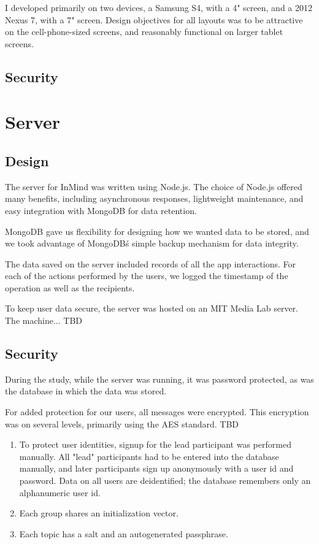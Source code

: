     I developed primarily on two devices, a Samsung S4, with a 4" screen,
    and a 2012 Nexus 7, with a 7" screen.
    Design objectives for all layouts was to be attractive on the cell-phone-sized screens,
    and reasonably functional on larger tablet screens.

    \subsection{Security}


  \section{Server}
    \subsection{Design}
      The server for InMind was written using Node.js.
      The choice of Node.js offered many benefits, including asynchronous responses,
      lightweight maintenance, and easy integration with MongoDB for data retention.

      MongoDB gave us flexibility for designing how we wanted data to be stored,
      and we took advantage of MongoDB\'s simple backup mechanism for data integrity.

      The data saved on the server included records of all the app interactions.
      For each of the actions performed by the users,
      we logged the timestamp of the operation as well as the recipients.

      To keep user data secure, the server was hosted on an MIT Media Lab server.
      The machine... TBD

    \subsection{Security}
      During the study, while the server was running, it was password protected,
      as was the database in which the data was stored.

      For added protection for our users, all messages were encrypted.
      This encryption was on several levels, primarily using the AES standard.
      TBD

      \begin{enumerate}
      \item To protect user identities, signup for the lead participant was performed manually.
      All "lead" participants had to be entered into the database manually,
      and later participants sign up anonymously with a user id and password.
      Data on all users are deidentified;
      the database remembers only an alphanumeric user id.
      \item Each group shares an initialization vector.
      \item Each topic has a salt and an autogenerated passphrase.
      \end{enumerate}



